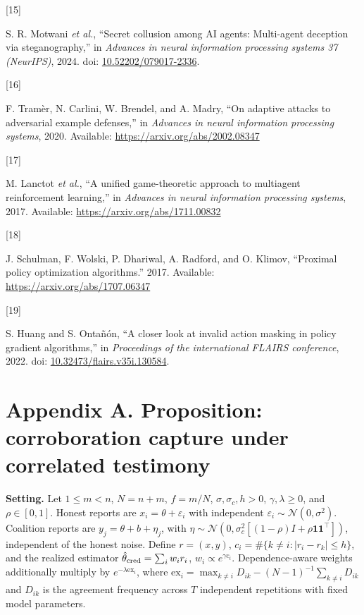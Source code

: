 \documentclass[
  12pt,
]{article}
\newlength{\cslhangindent}
\newlength{\csllabelwidth}
\newenvironment{CSLReferences}[2] %
 {\begin{list}{}{%
  \setlength{\itemindent}{0pt}
  \setlength{\leftmargin}{0pt}
  \setlength{\parsep}{0pt}
  \ifodd #1
   \setlength{\leftmargin}{\cslhangindent}
   \setlength{\itemindent}{-1\cslhangindent}
  \fi
  \setlength{\itemsep}{#2\baselineskip}}}
 {\end{list}}
\newcommand{\CSLLeftMargin}[1]{\parbox[t]{\csllabelwidth}{\strut#1\strut}}
\newcommand{\CSLRightInline}[1]{\parbox[t]{\linewidth - \csllabelwidth}{\strut#1\strut}}
\begin{document}
\begin{CSLReferences}{0}{0}
\CSLLeftMargin{{[}15{]} }%
\CSLRightInline{S. R. Motwani \emph{et al.}, {``Secret collusion among
{AI} agents: Multi-agent deception via steganography,''} in
\emph{Advances in neural information processing systems 37 (NeurIPS)},
2024. doi:
\href{https://doi.org/10.52202/079017-2336}{10.52202/079017-2336}.}

\CSLLeftMargin{{[}16{]} }%
\CSLRightInline{F. Tramèr, N. Carlini, W. Brendel, and A. Madry, {``On
adaptive attacks to adversarial example defenses,''} in \emph{Advances
in neural information processing systems}, 2020. Available:
\url{https://arxiv.org/abs/2002.08347}}

\CSLLeftMargin{{[}17{]} }%
\CSLRightInline{M. Lanctot \emph{et al.}, {``A unified game-theoretic
approach to multiagent reinforcement learning,''} in \emph{Advances in
neural information processing systems}, 2017. Available:
\url{https://arxiv.org/abs/1711.00832}}

\CSLLeftMargin{{[}18{]} }%
\CSLRightInline{J. Schulman, F. Wolski, P. Dhariwal, A. Radford, and O.
Klimov, {``Proximal policy optimization algorithms.''} 2017. Available:
\url{https://arxiv.org/abs/1707.06347}}

\CSLLeftMargin{{[}19{]} }%
\CSLRightInline{S. Huang and S. Ontañón, {``A closer look at invalid
action masking in policy gradient algorithms,''} in \emph{Proceedings of
the international FLAIRS conference}, 2022. doi:
\href{https://doi.org/10.32473/flairs.v35i.130584}{10.32473/flairs.v35i.130584}.}

\end{CSLReferences}

\FloatBarrier

\section*{Appendix A. Proposition: corroboration capture under
correlated
testimony}\label{appendix-a.-proposition-corroboration-capture-under-correlated-testimony}

\textbf{Setting.} Let \(1\le m<n\), \(N=n+m\), \(f=m/N\),
\(\sigma,\sigma_c,h>0\), \(\gamma,\lambda\ge0\), and \(\rho\in[0,1]\).
Honest reports are \(x_i=\theta+\varepsilon_i\) with independent
\(\varepsilon_i\sim\mathcal N(0,\sigma^2)\). Coalition reports are
\(y_j=\theta+b+\eta_j\), with
\(\eta\sim\mathcal N(0,\sigma_c^2[(1-\rho)I+\rho\mathbf1\mathbf1^\top])\),
independent of the honest noise. Define \(r=(x,y)\),
\(c_i=\#\{k\ne i:|r_i-r_k|\le h\}\), and the realized estimator
\(\hat\theta_{\rm cred}=\sum_i w_i r_i\), \(w_i\propto e^{\gamma c_i}\).
Dependence-aware weights additionally multiply by
\(e^{-\lambda\mathrm{ex}_i}\), where
\(\mathrm{ex}_i=\max_{k\ne i}D_{ik}-(N-1)^{-1}\sum_{k\ne i}D_{ik}\) and
\(D_{ik}\) is the agreement frequency across \(T\) independent
repetitions with fixed model parameters.
\end{document}
